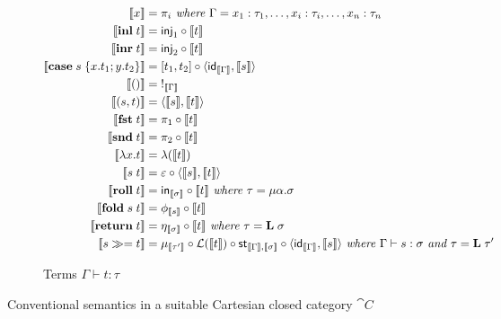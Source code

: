 \begin{figure}
\begin{subfigure}{\linewidth}
  \begin{align*}
  \small
  \llbracket x \rrbracket &= \pi_i
  \textit{ where }\Gamma = x_1: \tau_1, \ldots, x_i: \tau_i, \ldots, x_n: \tau_n
  \\
  \llbracket \mathbf{inl}\;t \rrbracket &= \mathsf{inj}_1 \circ \llbracket t \rrbracket
  \\
  \llbracket \mathbf{inr}\;t \rrbracket &= \mathsf{inj}_2 \circ \llbracket t \rrbracket
  \\
  \llbracket \mathbf{case}\;s\;\{x.t_1; y.t_2\} \rrbracket &= [t_1, t_2] \circ \langle \mathsf{id}_{\llbracket \Gamma \rrbracket}, \llbracket s \rrbracket\rangle
  \\
  \llbracket () \rrbracket &=\;!_{\llbracket \Gamma \rrbracket}
  \\
  \llbracket (s,t) \rrbracket &= \langle \llbracket s \rrbracket, \llbracket t \rrbracket\rangle
  \\
  \llbracket \mathbf{fst}\;t \rrbracket &= \pi_1 \circ \llbracket t \rrbracket
  \\
  \llbracket \mathbf{snd}\;t \rrbracket &= \pi_2 \circ \llbracket t \rrbracket
  \\
  \llbracket \lambda x.t \rrbracket &= \lambda(\llbracket t \rrbracket)
  \\
  \llbracket s\;t \rrbracket &= \varepsilon \circ \langle \llbracket s \rrbracket, \llbracket t \rrbracket\rangle
  \\
  \llbracket \mathbf{roll}\;t \rrbracket &= \mathsf{in}_{\llbracket \sigma \rrbracket} \circ \llbracket t \rrbracket
  \textit{ where }\tau = \mu\alpha.\sigma
  \\
  \llbracket \mathbf{fold}\;s\;t \rrbracket &= \phi_{\llbracket s \rrbracket} \circ \llbracket t \rrbracket
  \\
  \llbracket \mathbf{return}\;t \rrbracket &= \eta_{\llbracket \sigma \rrbracket} \circ \llbracket t \rrbracket
  \textit{ where }\tau = \mathbf{L}\;\sigma
  \\
  \llbracket {s}\gg={t} \rrbracket &= \mu_{\llbracket \tau' \rrbracket} \circ \mathcal{L}(\llbracket t \rrbracket) \circ \mathsf{st}_{\llbracket \Gamma \rrbracket,\llbracket \sigma \rrbracket} \circ \langle \mathsf{id}_{\llbracket \Gamma \rrbracket}, \llbracket s \rrbracket\rangle
  \textit{ where }\Gamma \vdash s: \sigma\textit{ and }\tau = \mathbf{L}\;\tau'
  \end{align*}
  \caption{Terms $\Gamma \vdash t: \tau$}
\end{subfigure}
\caption{Conventional semantics in a suitable Cartesian closed category $\cat{C}$}
\end{figure}
